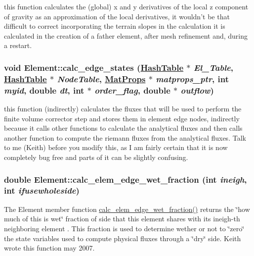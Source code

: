 this function calculates the (global) x and y derivatives of the local z component of gravity as an approximation of the local derivatives, it wouldn't be that difficult to correct incorporating the terrain slopes in the calculation it is calculated in the creation of a father element, after mesh refinement and, during a restart. 

\hypertarget{classElement_a78}{
\subsubsection[calc\_\-edge\_\-states]{\setlength{\rightskip}{0pt plus 5cm}void Element::calc\_\-edge\_\-states (\hyperlink{classHashTable}{Hash\-Table} $\ast$ {\em El\_\-Table}, \hyperlink{classHashTable}{Hash\-Table} $\ast$ {\em Node\-Table}, \hyperlink{structMatProps}{Mat\-Props} $\ast$ {\em matprops\_\-ptr}, int {\em myid}, double {\em dt}, int $\ast$ {\em order\_\-flag}, double $\ast$ {\em outflow})}}
\label{classElement_a78}


this function (indirectly) calculates the fluxes that will be used to perform the finite volume corrector step and stores them in element edge nodes, indirectly because it calls other functions to calculate the analytical fluxes and then calls another function to compute the riemann fluxes from the analytical fluxes. Talk to me (Keith) before you modify this, as I am fairly certain that it is now completely bug free and parts of it can be slightly confusing. 

\hypertarget{classElement_a130}{
\subsubsection[calc\_\-elem\_\-edge\_\-wet\_\-fraction]{\setlength{\rightskip}{0pt plus 5cm}double Element::calc\_\-elem\_\-edge\_\-wet\_\-fraction (int {\em ineigh}, int {\em ifusewholeside})}}
\label{classElement_a130}


The Element member function \hyperlink{classElement_a130}{calc\_\-elem\_\-edge\_\-wet\_\-fraction()} returns the \char`\"{}how much of this is wet\char`\"{} fraction of side that this element shares with its ineigh-th neighboring element . This fraction is used to determine wether or not to \char`\"{}zero\char`\"{} the state variables used to compute physical fluxes through a \char`\"{}dry\char`\"{} side. Keith wrote this function may 2007. 

